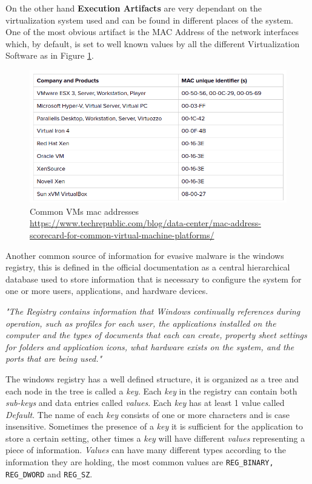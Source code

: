 On the other hand \textbf{Execution Artifacts} are very dependant on the virtualization system used and can be found in different places of the system. One of the most obvious artifact is the MAC Address of the network interfaces which, by default, is set to well known values by all the different Virtualization Software as in Figure \ref{fig:vms}.

\noindent
\begin{figure}[htp]
\centering
\includegraphics[width=\linewidth]{images/vms-mac-address.png}
\caption{Common VMs mac addresses \newline \url{https://www.techrepublic.com/blog/data-center/mac-address-scorecard-for-common-virtual-machine-platforms/}}
\label{fig:vms}
\end{figure}

Another common source of information for evasive malware is the windows registry, this is defined in the official documentation as a central hierarchical database used to store information that is necessary to configure the system for one or more users, applications, and hardware devices.

\textit{"The Registry contains information that Windows continually references during operation, such as profiles for each user, the applications installed on the computer and the types of documents that each can create, property sheet settings for folders and application icons, what hardware exists on the system, and the ports that are being used."}\cite{windocs}

The windows registry has a well defined structure, it is organized as a tree and each node in the tree is called a \textit{key}. Each \textit{key} in the registry can contain both \textit{sub-keys} and data entries called \textit{values}. Each \textit{key} has at least 1 value called \textit{Default}. The name of each \textit{key} consists of one or more characters and is case insensitive. Sometimes the presence of a \textit{key} it is sufficient for the application to store a certain setting, other times a \textit{key} will have different \textit{values} representing a piece of information. \textit{Values} can have many different types according to the information they are holding, the most common values are \lstinline{REG_BINARY, REG_DWORD} and \lstinline{REG_SZ}. 


